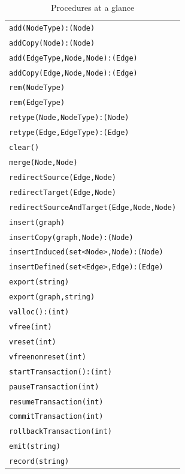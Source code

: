 \begin{table}[htbp]
\centering
\begin{tabular}{|l|}
\hline
\texttt{add(NodeType):(Node)}\\
\texttt{addCopy(Node):(Node)}\\
\texttt{add(EdgeType,Node,Node):(Edge)}\\
\texttt{addCopy(Edge,Node,Node):(Edge)}\\
\texttt{rem(NodeType)}\\
\texttt{rem(EdgeType)}\\
\texttt{retype(Node,NodeType):(Node)}\\
\texttt{retype(Edge,EdgeType):(Edge)}\\
\texttt{clear()}\\
\hline
\texttt{merge(Node,Node)}\\
\texttt{redirectSource(Edge,Node)}\\
\texttt{redirectTarget(Edge,Node)}\\
\texttt{redirectSourceAndTarget(Edge,Node,Node)}\\
\hline
\texttt{insert(graph)}\\
\texttt{insertCopy(graph,Node):(Node)}\\
\texttt{insertInduced(set<Node>,Node):(Node)}\\
\texttt{insertDefined(set<Edge>,Edge):(Edge)}\\
\texttt{export(string)}\\
\texttt{export(graph,string)}\\
\hline
\texttt{valloc():(int)}\\
\texttt{vfree(int)}\\
\texttt{vreset(int)}\\
\texttt{vfreenonreset(int)}\\
\hline
\texttt{startTransaction():(int)}\\
\texttt{pauseTransaction(int)}\\
\texttt{resumeTransaction(int)}\\
\texttt{commitTransaction(int)}\\
\texttt{rollbackTransaction(int)}\\
\hline
\texttt{emit(string)}\\
\texttt{record(string)}\\
\hline
\end{tabular}
\caption{Procedures at a glance}
\label{procstab}
\end{table}


\pagebreak

